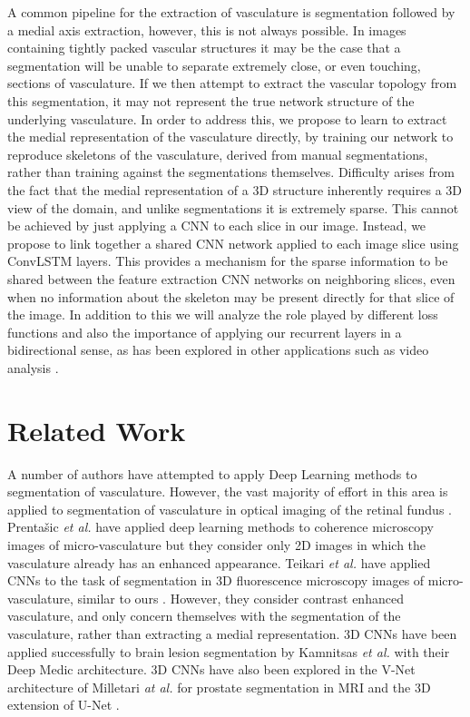 \documentclass[journal,transmag]{IEEEtran}
\begin{document}
A common pipeline for the extraction of vasculature is segmentation followed by a medial axis extraction, however, this is not always possible. In images containing tightly packed vascular structures it may be the case that a segmentation will be unable to separate extremely close, or even touching, sections of vasculature. If we then attempt to extract the vascular topology from this segmentation, it may not represent the true network structure of the underlying vasculature. In order to address this, we propose to learn to extract the medial representation of the vasculature directly, by training our network to reproduce skeletons of the vasculature, derived from manual segmentations, rather than training against the segmentations themselves. Difficulty arises from the fact that the medial representation of a 3D structure inherently requires a 3D view of the domain, and unlike segmentations it is extremely sparse. This cannot be achieved by just applying a CNN to each slice in our image. Instead, we propose to link together a shared CNN network applied to each image slice using ConvLSTM layers. This provides a mechanism for the sparse information to be shared between the feature extraction CNN networks on neighboring slices, even when no information about the skeleton may be present directly for that slice of the image. In addition to this we will analyze the role played by different loss functions and also the importance of applying our recurrent layers in a bidirectional sense, as has been explored in other applications such as video analysis \cite{GravesHybridLSTM}. 

\section{Related Work}


A number of authors have attempted to apply Deep Learning methods to segmentation of vasculature. However, the vast majority of effort in this area is applied to segmentation of vasculature in optical imaging of the retinal fundus  \cite{Liskowski2016,Fang2015,Li2016}. Prentašic \emph{et al. } have applied deep learning methods to coherence microscopy images of micro-vasculature \cite{Liskowski2016} but they consider only 2D images in which the vasculature already has an enhanced appearance. Teikari \emph{et al. } have applied CNNs to the task of segmentation in 3D fluorescence microscopy images of micro-vasculature, similar to ours \cite{Teikari2016}. However, they consider contrast enhanced vasculature, and only concern themselves with the segmentation of the vasculature, rather than extracting a medial representation. 3D CNNs have been applied successfully to brain lesion segmentation by Kamnitsas \emph{et al.}  \cite{Kamnitsas2016} with their Deep Medic architecture. 3D CNNs have also been explored in the V-Net architecture of Milletari \emph{at al.} \cite{Milletari2016} for prostate segmentation in MRI and the 3D extension of U-Net \cite{Cicek2016}.
\end{document}
